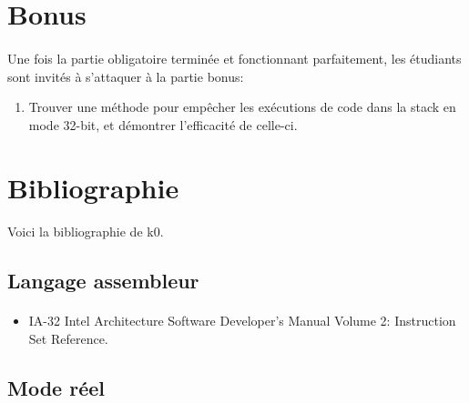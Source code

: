 \documentclass[10pt,a4wide]{article}
\begin{document}
\section{Bonus}

\paragraph{}

Une fois la partie obligatoire termin\'ee et fonctionnant parfaitement, les
\'etudiants sont invit\'es \`a s'attaquer \`a la partie bonus:

\begin{enumerate}
\item Trouver une m\'ethode pour emp\^echer les ex\'ecutions de code dans
      la stack en mode 32-bit, et d\'emontrer l'efficacit\'e de celle-ci.
\end{enumerate}

\section{Bibliographie}

\paragraph{}

Voici la bibliographie de k0.

\subsection{Langage assembleur}

\paragraph{}

\begin{itemize}
\item IA-32 Intel Architecture Software Developer's Manual Volume 2: 
      Instruction Set Reference.
\end{itemize}

\subsection{Mode r\'eel}

\paragraph{}
\end{document}
